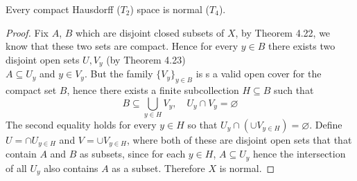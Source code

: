 \documentclass[../../main.tex]{subfiles}
\begin{document}
\begin{wts}
Every compact Hausdorff ($T_2$) space is normal ($T_4$).
\end{wts}
\begin{proof}
Fix $A$, $B$ which are disjoint closed subsets of $X$, by Theorem 4.22, we know that these two sets are compact. Hence for every $y\in B$ there exists two disjoint open sets $U, V_y$ (by Theorem 4.23)\\

$A\subseteq U_y$ and $y\in V_y$. But the family $\{V_y\}_{y\in B}$ is s a valid open cover for the compact set $B$, hence there exists a finite subcollection $H\subseteq B$ such that 
\[
B\subseteq \bigcup_{y\in H}V_y,\quad U_y\cap V_y=\varnothing
\]
The second equality holds for every $y\in H$ so that $U_y\cap(\cup V_{y\in H})=\varnothing$. Define $U = \cap U_{y\in H}$ and $V = \cup V_{y\in H}$, where both of these are disjoint open sets that that contain $A$ and $B$ as subsets, since for each $y\in H$, $A\subseteq U_y$ hence the intersection of all $U_y$ also contains $A$ as a subset. Therefore $X$ is normal.
\end{proof}
\end{document}

